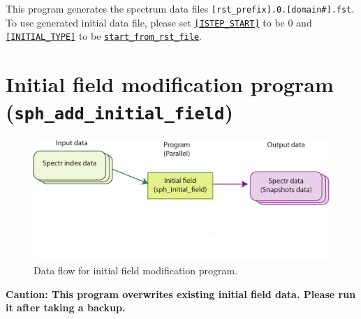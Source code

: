 %
This program generates the spectrum data files \verb|[rst_prefix].0.[domain#].fst|. To use generated initial data file, please set 
 \hyperref[href_t:i_step_init_ctl]{{\tt [ISTEP\_START]}} to be 0 and \hyperref[href_t:restart_file_ctl]{{\tt [INITIAL\_TYPE]}} to be \hyperref[href_t:restart_file_ctl]{{\tt start\_from\_rst\_file}}.

\newpage
\section{Initial field modification program \\
({\tt sph\_add\_initial\_field})}
\label{sec:ad_initial_field}
%
\begin{figure}[htbp]
\begin{center}
\includegraphics*[width=130mm]{images/flow_ini}
\end{center}
\caption{Data flow for initial field modification program.}
\label{fig:flow_add_ini}
\end{figure}
%
{\bf Caution: This program overwrites existing initial field data. Please run it after taking a backup.} \\


